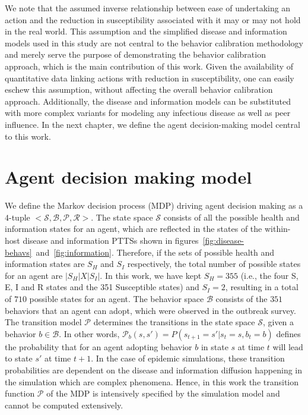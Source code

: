 \documentclass[doublespace,draft]{VTthesis}
\begin{document}
    We note that the assumed inverse relationship between ease of undertaking an action and the reduction in susceptibility associated with it may or may not hold in the real world. This assumption and the simplified disease and information models used in this study are not central to the behavior calibration methodology and merely serve the purpose of demonstrating the behavior calibration approach, which is the main contribution of this work. Given the availability of quantitative data linking actions with reduction in susceptibility, one can easily eschew this assumption, without affecting the overall behavior calibration approach. Additionally, the disease and information models can be substituted with more complex variants for modeling any infectious disease as well as peer influence. In the next chapter, we define the agent decision-making model central to this work.

    \chapter{Agent decision making model}\label{ch:decision-model}
    We define the Markov decision process (MDP) driving agent decision making as a $4$-tuple $\big<\mathcal{S,B,P,R}\big>$. The state space $\mathcal{S}$ consists of all the possible health and information states for an agent, which are reflected in the states of the within-host disease and information PTTSs shown in figures~\ref{fig:disease-behavs}~and~\ref{fig:information}. Therefore, if the sets of possible health and information states are $S_H$ and $S_I$ respectively, the total number of possible states for an agent are $|S_H| X |S_I|$. In this work, we have kept $S_H = 355$ (i.e., the four S, E, I and R states and the 351 Susceptible states) and $S_I = 2$, resulting in a total of $710$ possible states for an agent. The behavior space $\mathcal{B}$ consists of the $351$ behaviors that an agent can adopt, which were observed in the outbreak survey. The transition model $\mathcal{P}$ determines the transitions in the state space $\mathcal{S}$, given a behavior $b \in \mathcal{B}$. In other words, $\mathcal{P}_b(s,s') = P(s_{t+1} = s' | s_t = s, b_t = b)$ defines the probability that for an agent adopting behavior $b$ in state $s$ at time $t$ will lead to state $s'$ at time $t+1$. In the case of epidemic simulations, these transition probabilities are dependent on the disease and information diffusion happening in the simulation which are complex phenomena. Hence, in this work the transition function $\mathcal{P}$ of the MDP is intensively specified by the simulation model and cannot be computed extensively. 
    
\end{document}
